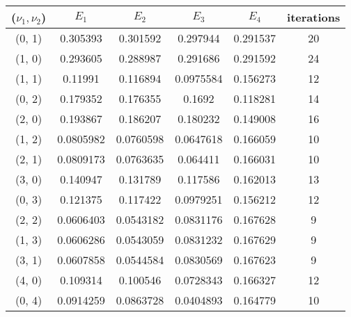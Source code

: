 \documentclass[12pt]{article}
\begin{document}
\begin{center}
\begin{tabular}{||c|cccc|c||}
\hline \hline
 ($\nu_1, \nu_2$)   & $E_1$ & $E_2$ &  $E_3$ & $E_4$ &   iterations \\
\hline \hline
  \color{red}(0, 1)   &   \color{red}0.305393  &  \color{red}0.301592  &  \color{red}0.297944  &   \color{red}0.291537 &   \color{red}20 \\
 (1, 0)   &  0.293605  &      0.288987  &      0.291686  &       0.291592 &           24 \\ \hline
  \color{red}(1, 1)   &   \color{red}0.11991   &  \color{red}0.116894  &  \color{red}0.0975584 &  \color{red}0.156273 &  \color{red}12 \\
 (0, 2)   &  0.179352  &      0.176355  &      0.1692    &       0.118281 &           14 \\ 
 (2, 0)   &  0.193867  &      0.186207  &      0.180232  &       0.149008 &           16 \\ \hline
  \color{red}(1, 2)   &   \color{red}0.0805982 &       \color{red}0.0760598 &      0.0647618 &       0.166059 &    \color{red}10 \\
  \color{red}(2, 1)   &  0.0809173 &      0.0763635 &       \color{red}0.064411  &        \color{red}0.166031 &   \color{red}10 \\
 (3, 0)   &  0.140947  &      0.131789  &      0.117586  &       0.162013 &           13 \\
 (0, 3)   &  0.121375  &      0.117422  &      0.0979251 &       0.156212 &           12 \\ \hline
  \color{red}(2, 2)   &  0.0606403 &      0.0543182 &  0.0831176 &       0.167628 &  \color{red}9 \\
  \color{red}(1, 3)   &  \color{red}0.0606286 &  \color{red}0.0543059 &      0.0831232 &       0.167629 &  \color{red}9 \\
  \color{red}(3, 1)   &  0.0607858 &      0.0544584 &   \color{red}0.0830569 &     \color{red}0.167623 &   \color{red}9 \\
 (4, 0)   &  0.109314  &      0.100546  &      0.0728343 &       0.166327 &           12 \\
 (0, 4)   &  0.0914259 &      0.0863728 &      0.0404893 &       0.164779 &           10 \\
\hline \hline
\end{tabular}
\end{center}
 
\end{document}
